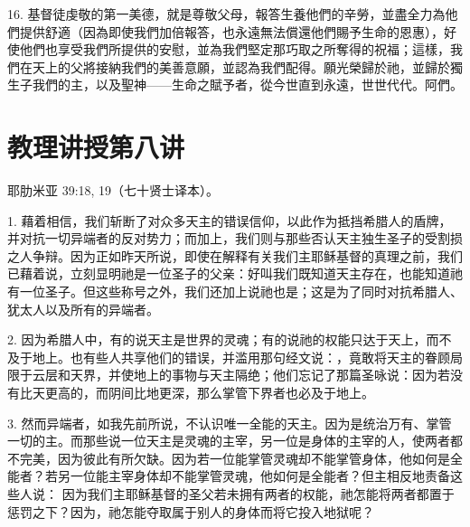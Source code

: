 16. 基督徒虔敬的第一美德，就是尊敬父母，報答生養他們的辛勞，並盡全力為他們提供舒適（因為即使我們加倍報答，也永遠無法償還他們賜予生命的恩惠），好使他們也享受我們所提供的安慰，並為我們堅定那巧取之所奪得的祝福；這樣，我們在天上的父將接納我們的美善意願，並認為我們配得。願光榮歸於祂，並歸於獨生子我們的主，以及聖神——生命之賦予者，從今世直到永遠，世世代代。阿們。\par



\section{教理讲授第八讲}

\par

耶肋米亚 39:18, 19（七十贤士译本）。\par

\par

1. 藉着相信，我们斩断了对众多天主的错误信仰，以此作为抵挡希腊人的盾牌，并对抗一切异端者的反对势力；而加上，我们则与那些否认天主独生圣子的受割损之人争辩。因为正如昨天所说，即使在解释有关我们主耶稣基督的真理之前，我们已藉着说，立刻显明祂是一位圣子的父亲：好叫我们既知道天主存在，也能知道祂有一位圣子。但这些称号之外，我们还加上说祂也是；这是为了同时对抗希腊人、犹太人以及所有的异端者。\par

2. 因为希腊人中，有的说天主是世界的灵魂；有的说祂的权能只达于天上，而不及于地上。也有些人共享他们的错误，并滥用那句经文说：，竟敢将天主的眷顾局限于云层和天界，并使地上的事物与天主隔绝；他们忘记了那篇圣咏说：因为若没有比天更高的，而阴间比地更深，那么掌管下界者也必及于地上。\par

3. 然而异端者，如我先前所说，不认识唯一全能的天主。因为是统治万有、掌管一切的主。而那些说一位天主是灵魂的主宰，另一位是身体的主宰的人，使两者都不完美，因为彼此有所欠缺。因为若一位能掌管灵魂却不能掌管身体，他如何是全能者？若另一位能主宰身体却不能掌管灵魂，他如何是全能者？但主相反地责备这些人说： 因为我们主耶稣基督的圣父若未拥有两者的权能，祂怎能将两者都置于惩罚之下？因为，祂怎能夺取属于别人的身体而将它投入地狱呢？\par

